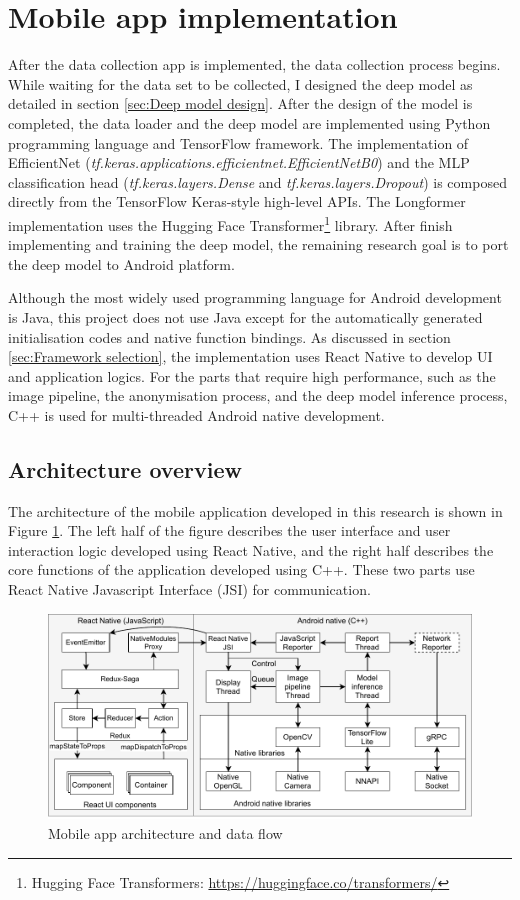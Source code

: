 \section{Mobile app implementation}
\label{sec:Mobile app implementation}
After the data collection app is implemented, the data collection process begins.
While waiting for the data set to be collected, I designed the deep model as detailed in section \ref{sec:Deep model design}.
After the design of the model is completed, the data loader and the deep model are implemented using Python programming language and TensorFlow framework.
The implementation of EfficientNet (\textit{tf.keras.applications.efficientnet.EfficientNetB0}) and the MLP classification head (\textit{tf.keras.layers.Dense} and \textit{tf.keras.layers.Dropout}) is composed directly from the TensorFlow Keras-style high-level APIs.
The Longformer implementation uses the Hugging Face Transformer\footnote{Hugging Face Transformers: \url{https://huggingface.co/transformers/}} library.
After finish implementing and training the deep model, the remaining research goal is to port the deep model to Android platform.

Although the most widely used programming language for Android development is Java, this project does not use Java except for the automatically generated initialisation codes and native function bindings.
As discussed in section \ref{sec:Framework selection}, the implementation uses React Native to develop UI and application logics.
For the parts that require high performance, such as the image pipeline, the anonymisation process, and the deep model inference process, C++ is used for multi-threaded Android native development.

\subsection{Architecture overview}
The architecture of the mobile application developed in this research is shown in Figure \ref{fig:4-mobile-arch}.
The left half of the figure describes the user interface and user interaction logic developed using React Native, and the right half describes the core functions of the application developed using C++.
These two parts use React Native Javascript Interface (JSI) for communication.

\begin{figure}[!ht]
    \centering
    \includegraphics[width=\textwidth]{implementation/imgs/4-mobile-arch.pdf}
    \caption{Mobile app architecture and data flow}
    \label{fig:4-mobile-arch}
\end{figure}

